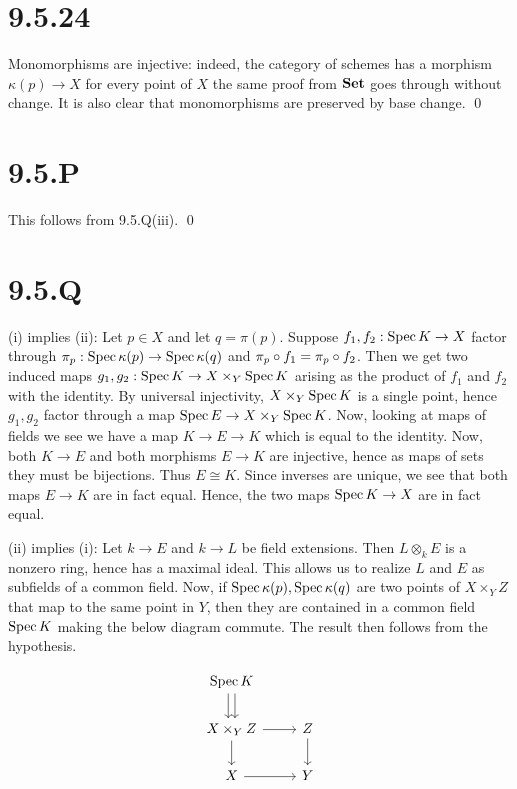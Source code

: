 \documentclass{article}
\begin{document}
\section{9.5.24}
Monomorphisms are injective: indeed, the category of schemes has a morphism
$\kappa(p) \to X$ for every point of $X$ the same
proof from $\mathbf{Set}$ goes through without change. It is also
clear that monomorphisms are preserved by base change. \qed

\section{9.5.P}
This follows from 9.5.Q(iii). \qed

\section{9.5.Q}
 (i) implies (ii): Let $p \in X$ and let
$q=\pi(p)$. Suppose $f_1, f_2: \operatorname{Spec} K \to X$ factor through
$\pi_p:\operatorname{Spec} \kappa(p) \to \operatorname{Spec} \kappa(q)$ and $\pi_p \circ f_1=\pi_p\circ f_2$. Then we get two induced
maps $g_1,g_2: \operatorname{Spec} K \to X \times_Y \operatorname{Spec} K$ arising as the product of $f_1$
and $f_2$ with the identity. By universal injectivity,
$X \times_Y \operatorname{Spec} K$ is a single point, hence $g_1, g_2$ factor
through a map $\operatorname{Spec} E \to X \times_Y \operatorname{Spec} K$. Now, looking at maps of fields we see we
have a map $K \to E \to K$ which is equal to the identity. Now, both
$K \to E$ and both morphisms $E \to K$ are
injective, hence as maps of sets they must be bijections. Thus
$E \cong K$. Since inverses are unique, we see that both maps
$E \to K$ are in fact equal. Hence, the two maps
$\operatorname{Spec} K \to X$ are in fact equal.

(ii) implies (i): Let $k \to E$ and $k \to L$ be
field extensions. Then $L \otimes_k E$ is a nonzero ring, hence has a
maximal ideal. This allows us to realize $L$ and
$E$ as subfields of a common field. Now, if
$\operatorname{Spec} \kappa(p), \operatorname{Spec} \kappa(q)$ are two points of $X \times_Y Z$ that map to
the same point in $Y$, then they are contained in a common
field $\operatorname{Spec} K$ making the below diagram commute. The result then
follows from the hypothesis.

\[\begin{tikzcd}
        {\operatorname{Spec} K} \\{X\times_Y Z} & Z \\
        X                                                             & Y
        \arrow[from=2-1, to=3-1]
        \arrow[from=2-1, to=2-2]
        \arrow[from=3-1, to=3-2]
        \arrow[from=2-2, to=3-2]
        \arrow[shift left=1, from=1-1, to=2-1]
        \arrow[shift right=1, from=1-1, to=2-1]
    \end{tikzcd}\]
\end{document}
